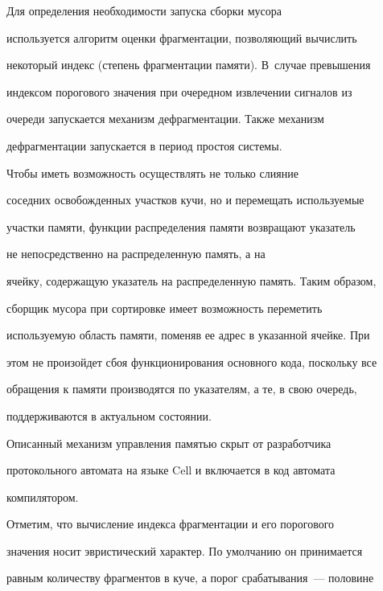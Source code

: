       


      Для определения необходимости запуска сборки мусора 


используется алгоритм оценки фрагментации, позволяющий вычислить 


некоторый индекс (степень фрагментации памяти). В~случае превышения 


индексом порогового значения при очередном извлечении сигналов из 


очереди запускается механизм дефрагментации. Также механизм 


дефрагментации запускается в период простоя сис\-те\-мы.


      


      Чтобы иметь возможность осуществлять не только слияние 


соседних освобожденных участков кучи, но и перемещать используемые 


участки памяти, функции распределения памяти возвращают указатель 


не непосредственно на распределенную память, а на 


ячейку, содержащую указатель на распределенную память. Таким образом, 


сборщик мусора при сортировке имеет возможность переметить 


используемую область памяти, поменяв ее адрес в указанной ячейке. При 


этом не произойдет сбоя функционирования основного кода, поскольку все 


обращения к памяти производятся по указателям, а те, в свою очередь, 


поддерживаются в актуальном состоянии.


      


      Описанный механизм управления памятью скрыт от разработчика 


протокольного автомата на языке Cell и включается в код автомата 


компилятором.


      


      Отметим, что вычисление индекса фрагментации и его порогового 


значения носит эвристический характер. По умолчанию он принимается 


равным количеству фрагментов в куче, а порог срабатывания~--- половине 


